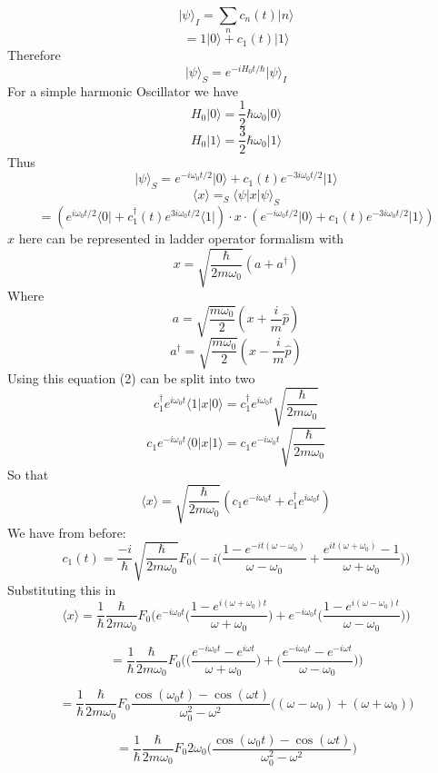 \documentclass[12pt]{article}
\newcommand{\ket}[1]{\vert{#1}\rangle}
\newcommand{\bra}[1]{\langle{#1}\vert}
\begin{document}
$$ \ket{\psi}_I = \sum_n c_n (t) \ket{n} $$
$$ = 1 \ket{0} + c_1 (t) \ket{1} $$
Therefore 
$$ \ket{\psi}_S = e^{-i H_0 t / \hbar} \ket{\psi}_I $$
For a simple harmonic Oscillator we have 
$$ H_0 \ket{0} = \frac{1}{2} \hbar \omega_0 \ket{0} $$
$$ H_0 \ket{1} = \frac{3}{2} \hbar \omega_0 \ket{1} $$
Thus 
$$ \ket{\psi}_S = e^{-i \omega_0 t /2 } \ket{0} + c_1 (t) e^{-3i \omega_0 t/2 } \ket{1} $$
$$ \langle x \rangle = _S\langle \psi | x | \psi \rangle_S $$
\begin{equation} = ( e^{i \omega_0 t/2 } \bra{0} + c_1^{\dagger} (t) e^{3i \omega_0 t/2} \bra{1} ) \cdot x \cdot ( e^{-i \omega_0 t / 2 } \ket{0} + c_1 (t) e^{-3i \omega_0 t /2 } \ket{1} ) \end{equation} 
$x$ here can be represented in ladder operator formalism with 
$$ x = \sqrt{\frac{\hbar}{2 m \omega_0 }} (a + a^{\dagger}) $$
Where 
$$ a = \sqrt{\frac{m \omega_0}{2}} (x + \frac{i}{m} \hat{p}) $$
$$ a^{\dagger} = \sqrt{\frac{m \omega_0}{2}} (x-\frac{i}{m} \hat{p} ) $$
Using this equation (2) can be split into two 
$$ c_1^{\dagger} e^{i \omega_0 t} \langle 1 | x | 0 \rangle = c_1^{\dagger} e^{i \omega_0 t} \sqrt{\frac{\hbar}{2m \omega_0} } $$
$$ c_1 e^{-i \omega_0 t} \langle 0 | x | 1 \rangle = c_1 e^{-i \omega_0 t} \sqrt{\frac{\hbar}{2 m \omega_0}} $$
So that 
$$ \langle x \rangle = \sqrt{\frac{\hbar}{2 m \omega_0 }} ( c_1 e^{-i \omega_0 t } + c_1^{\dagger} e^{i \omega_0 t} ) $$
We have from before: 
$$ c_1 (t) = \frac{-i}{\hbar} \sqrt{\frac{\hbar}{2 m \omega_0}} F_0 \Big( -i \Big( \frac{1-e^{-it(\omega - \omega_0)}}{\omega-\omega_0} + \frac{e^{it(\omega + \omega_0) } -1}{\omega+ \omega_0} \Big) \Big) $$
Substituting this in 
$$ \langle x \rangle = \frac{1}{\hbar} \frac{\hbar }{2 m \omega_0} F_0 \Big( e^{-i \omega_0 t} \Big( \frac{1-e^{i(\omega+ \omega_0)t }}{\omega+\omega_0} \Big) + e^{-i \omega_0 t} \Big( \frac{1-e^{i(\omega-\omega_0)t}}{\omega-\omega_0}  \Big)\Big) $$

$$ = \frac{1}{\hbar} \frac{\hbar }{2 m \omega_0} F_0 \Big( \Big( \frac{e^{-i \omega_0 t}-e^{i\omega t }}{\omega+\omega_0} \Big) + \Big( \frac{e^{-i \omega_0 t}-e^{-i\omega t}}{\omega-\omega_0}  \Big)\Big) $$

$$ = \frac{1}{\hbar}  \frac{\hbar}{2 m \omega_0 } F_0 \frac{\cos(\omega_0 t) - \cos (\omega t)}{\omega_0^2 - \omega^2} \Big((\omega - \omega_0 )+ (\omega + \omega_0) \Big) $$

$$ = \frac{1}{\hbar} \frac{\hbar}{2 m \omega_0} F_0 2 \omega_0 \Big( \frac{\cos(\omega_0 t) - \cos (\omega t) }{\omega_0^2 - \omega^2} \Big) $$
\end{document}
